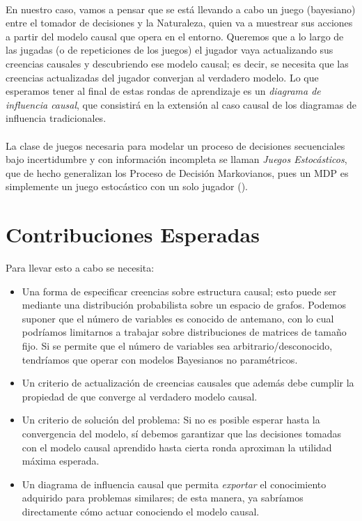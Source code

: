 \documentclass[11pt]{article}
\theoremstyle{plain}
\begin{document}
\\
En nuestro caso, vamos a pensar que se está llevando a cabo un juego (bayesiano) entre el tomador de decisiones y la Naturaleza, quien va a muestrear sus acciones a partir del modelo causal que opera en el entorno. Queremos que a lo largo de las jugadas (o de repeticiones de los juegos) el jugador vaya actualizando sus creencias causales y descubriendo ese modelo causal; es decir, se necesita que las creencias actualizadas del jugador converjan al verdadero modelo. Lo que esperamos tener al final de estas rondas de aprendizaje es un \textit{diagrama de influencia causal}, que consistirá en la extensión al caso causal de los diagramas de influencia tradicionales.\\
\\
La clase de juegos necesaria para modelar un proceso de decisiones secuenciales bajo incertidumbre y con información incompleta se llaman \textit{Juegos Estocásticos}, que de hecho generalizan los Proceso de Decisión Markovianos, pues un MDP es simplemente un juego estocástico con un solo jugador (\cite{shoham2008multiagent}).
\section{Contribuciones Esperadas}
Para llevar esto a cabo se necesita:
\begin{itemize}
\item Una forma de especificar creencias sobre estructura causal; esto puede ser mediante una distribución probabilista sobre un espacio de grafos. Podemos suponer que el número de variables es conocido de antemano, con lo cual podríamos limitarnos a trabajar sobre distribuciones de matrices de tamaño fijo. Si se permite que el número de variables sea arbitrario/desconocido, tendríamos que operar con modelos Bayesianos no paramétricos.
\item Un criterio de actualización de creencias causales que además debe cumplir la propiedad de que converge al verdadero modelo causal.
\item Un criterio de solución del problema: Si no es posible esperar hasta la convergencia del modelo, sí debemos garantizar que las decisiones tomadas con el modelo causal aprendido hasta cierta ronda aproximan la utilidad máxima esperada.
\item Un diagrama de influencia causal que permita \textit{exportar} el conocimiento adquirido para problemas similares; de esta manera, ya sabríamos directamente cómo actuar conociendo el modelo causal.
\end{itemize}
\end{document}
